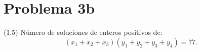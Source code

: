 
\section*{Problema 3b}
(1.5) Número de soluciones de enteros positivos de:
\[
  (x_1+x_2+x_3)(y_1+y_2+y_3+y_4) = 77.
\]


